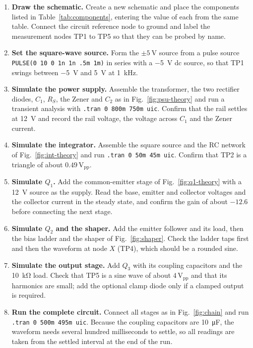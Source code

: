 \documentclass[12pt,a4paper]{article}
\begin{document}
	\begin{enumerate}[label=\arabic*., leftmargin=2.2em, itemsep=0.35em]
		\item \textbf{Draw the schematic.} Create a new schematic and place the components listed in Table~\ref{tab:components}, entering the value of each from the same table. Connect the circuit reference node to ground and label the measurement nodes TP1 to TP5 so that they can be probed by name.
		\item \textbf{Set the square-wave source.} Form the $\pm\SI{5}{\volt}$ source from a pulse source \texttt{PULSE(0 10 0 1n 1n .5m 1m)} in series with a \SI{-5}{\volt} dc source, so that TP1 swings between \SI{-5}{\volt} and \SI{+5}{\volt} at \SI{1}{\kilo\hertz}.
		\item \textbf{Simulate the power supply.} Assemble the transformer, the two rectifier diodes, $C_1$, $R_S$, the Zener and $C_2$ as in Fig.~\ref{fig:psu-theory} and run a transient analysis with \texttt{.tran 0 800m 750m uic}. Confirm that the rail settles at \SI{12}{\volt} and record the rail voltage, the voltage across $C_1$ and the Zener current.
		\item \textbf{Simulate the integrator.} Assemble the square source and the RC network of Fig.~\ref{fig:int-theory} and run \texttt{.tran 0 50m 45m uic}. Confirm that TP2 is a triangle of about $0.49\,\mathrm{V_{pp}}$.
		\item \textbf{Simulate $Q_1$.} Add the common-emitter stage of Fig.~\ref{fig:q1-theory} with a \SI{12}{\volt} source as the supply. Read the base, emitter and collector voltages and the collector current in the steady state, and confirm the gain of about $-12.6$ before connecting the next stage.
		\item \textbf{Simulate $Q_2$ and the shaper.} Add the emitter follower and its load, then the bias ladder and the shaper of Fig.~\ref{fig:shaper}. Check the ladder taps first and then the waveform at node $X$ (TP4), which should be a rounded sine.
		\item \textbf{Simulate the output stage.} Add $Q_3$ with its coupling capacitors and the \SI{10}{\kilo\ohm} load. Check that TP5 is a sine wave of about $4\,\mathrm{V_{pp}}$ and that its harmonics are small; add the optional clamp diode only if a clamped output is required.
		\item \textbf{Run the complete circuit.} Connect all stages as in Fig.~\ref{fig:chain} and run \texttt{.tran 0 500m 495m uic}. Because the coupling capacitors are \SI{10}{\micro\farad}, the waveform needs several hundred milliseconds to settle, so all readings are taken from the settled interval at the end of the run.

\end{enumerate}
\end{document}
